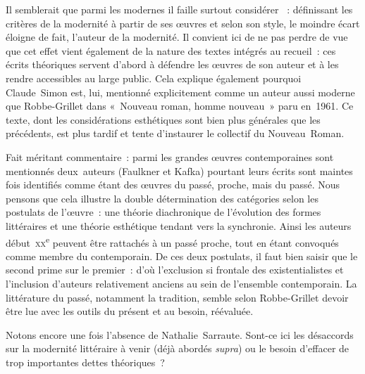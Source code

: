\documentclass[12pt, a4paper]{article}
\begin{document}
Il semblerait que parmi les modernes il faille surtout considérer \robbe{}~: définissant les critères de la modernité à partir de ses œuvres et selon son style, le moindre écart éloigne de fait, l'auteur de la modernité. Il convient ici de ne pas perdre de vue que cet effet vient également de la nature des textes intégrés au recueil~: ces écrits théoriques servent d'abord à défendre les œuvres de son auteur et à les rendre accessibles au large public. Cela explique également pourquoi Claude~Simon est, lui, mentionné explicitement comme un auteur aussi moderne que Robbe-Grillet dans «~Nouveau roman, homme nouveau~» paru en~1961. Ce texte, dont les considérations esthétiques sont bien plus générales que les précédents, est plus tardif et tente d'instaurer le collectif du Nouveau~Roman.




Fait méritant commentaire~: parmi les grandes œuvres contemporaines sont mentionnés deux~auteurs (Faulkner et Kafka) pourtant leurs écrits sont maintes fois identifiés comme étant des œuvres du passé, proche, mais du passé. Nous pensons que cela illustre la double détermination des catégories selon les postulats de l'œuvre~: une théorie diachronique de l'évolution des formes littéraires et une théorie esthétique tendant vers la synchronie. Ainsi les auteurs début~\textsc{xx}\textsuperscript{e} peuvent être rattachés à un passé proche, tout en étant convoqués comme membre du contemporain. De ces deux postulats, il faut bien saisir que le second prime sur le premier~: d'où l'exclusion si frontale des existentialistes et l'inclusion d'auteurs relativement anciens au sein de l'ensemble contemporain. La littérature du passé, notamment la tradition, semble selon Robbe-Grillet devoir être lue avec les outils du présent et au besoin, réévaluée.







Notons encore une fois l'absence de Nathalie~Sarraute. Sont-ce ici les désaccords sur la modernité littéraire à venir (déjà abordés \textit{supra}) ou le besoin d'effacer de trop importantes dettes théoriques~?
\end{document}
